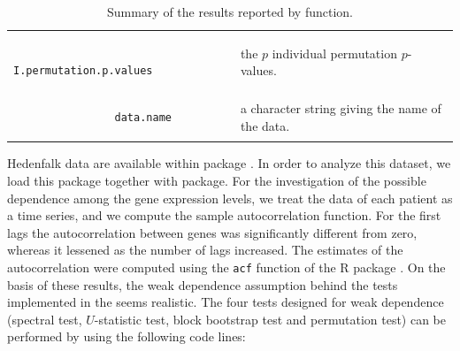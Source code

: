 \begin{table}[htb]
\begin{center}
\begin{tabular}{ll}
			\hspace{-6cm}	\begin{lstlisting}	
				I.permutation.p.values
			\end{lstlisting}& the $p$ individual permutation $p$-values.\\
			\hspace{-6cm}	\begin{lstlisting}	
				data.name
			\end{lstlisting}& a character string giving the name of the data.\\
			\hline
		\end{tabular}
	\end{center}
	\caption{Summary of the results reported by  function.}
	\label{ca:re}
\end{table}

Hedenfalk data are available within  package \citep{CRdUA_CMPB}. In order to analyze this dataset,
we load this package together with  package. For the investigation of the possible dependence among the gene expression levels, we treat the data of each patient as a time series, and we compute the
sample autocorrelation function. For the first lags the autocorrelation
between genes was significantly different from zero, whereas it lessened
as the number of lags increased. The estimates of the autocorrelation were computed using the \texttt{acf} function of the R package . On the basis of these results, the weak dependence assumption behind the  tests implemented in  the  seems realistic. The four tests designed for weak dependence (spectral test, $U$-statistic test, block bootstrap test and permutation test) can be performed by using the following code lines:

